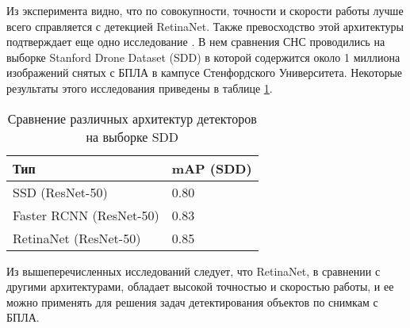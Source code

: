 Из эксперимента видно, что по совокупности, точности и скорости работы лучше всего справляется с детекцией RetinaNet. Также превосходство этой архитектуры подтверждает еще одно исследование \cite{lib-benchmark-sdd}. В нем сравнения СНС проводились на выборке Stanford Drone Dataset (SDD) \cite{lib-sdd} в которой содержится около 1 миллиона изображений снятых с БПЛА в кампусе Стенфордского Университета. Некоторые результаты этого исследования приведены в таблице \ref{leaderboard-table-sdd}.

\begin{table}[H]
  \caption{Сравнение различных архитектур детекторов на выборке SDD}\label{leaderboard-table-sdd}
  \begin{tabular}{|p{7cm}|p{5cm}|}
    \hline
    {Тип} & {mAP (SDD)} \\
    \hline
    SSD (ResNet-50) & 0.80 \\
    \hline
    Faster RCNN (ResNet-50) & 0.83 \\
    \hline
    RetinaNet (ResNet-50) & 0.85 \\
    \hline
  \end{tabular}
\end{table}

Из вышеперечисленных исследований следует, что RetinaNet, в сравнении с другими архитектурами, обладает высокой точностью и скоростью работы, и ее можно применять для решения задач детектирования объектов по снимкам с БПЛА.
